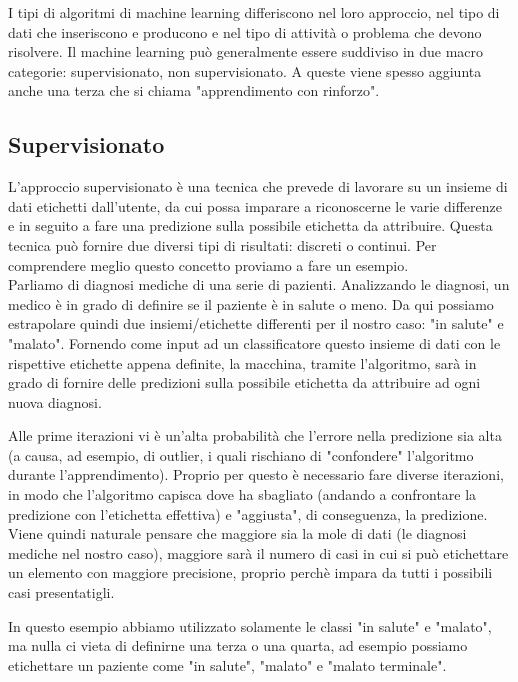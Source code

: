 \documentclass[12pt,italian]{report}
\begin{document}
I tipi di algoritmi di machine learning differiscono nel loro approccio, nel tipo di dati che inseriscono e producono e nel tipo di attività o problema che devono risolvere. Il machine learning può generalmente essere suddiviso in due macro categorie: supervisionato, non supervisionato. A queste viene spesso aggiunta anche una terza che si chiama "apprendimento con rinforzo".


\subsection{Supervisionato}

L'approccio supervisionato è una tecnica che prevede di lavorare su un insieme di dati etichetti dall'utente, da cui possa imparare a riconoscerne le varie differenze e in seguito a fare una predizione sulla possibile etichetta da attribuire. Questa tecnica può fornire due diversi tipi di risultati: discreti o continui. Per comprendere meglio questo concetto proviamo a fare un esempio.
\\

Parliamo di diagnosi mediche di una serie di pazienti. Analizzando le diagnosi, un medico è in grado di definire se il paziente è in salute o meno. Da qui possiamo estrapolare quindi due insiemi/etichette differenti per il nostro caso: "in salute" e "malato". Fornendo come input ad un classificatore questo insieme di dati con le rispettive etichette appena definite, la macchina, tramite l'algoritmo, sarà in grado di fornire delle predizioni sulla possibile etichetta da attribuire ad ogni nuova diagnosi.

Alle prime iterazioni vi è un'alta probabilità che l'errore nella predizione sia alta (a causa, ad esempio, di outlier, i quali rischiano di "confondere" l'algoritmo durante l'apprendimento). Proprio per questo è necessario fare diverse iterazioni, in modo che l'algoritmo capisca dove ha sbagliato (andando a confrontare la predizione con l'etichetta effettiva) e "aggiusta", di conseguenza, la predizione. Viene quindi naturale pensare che maggiore sia la mole di dati (le diagnosi mediche nel nostro caso), maggiore sarà il numero di casi in cui si può etichettare un elemento con maggiore precisione, proprio perchè impara da tutti i possibili casi presentatigli.

In questo esempio abbiamo utilizzato solamente le classi "in salute" e "malato", ma nulla ci vieta di definirne una terza o una quarta, ad esempio possiamo etichettare un paziente come "in salute", "malato" e "malato terminale".
\end{document}
